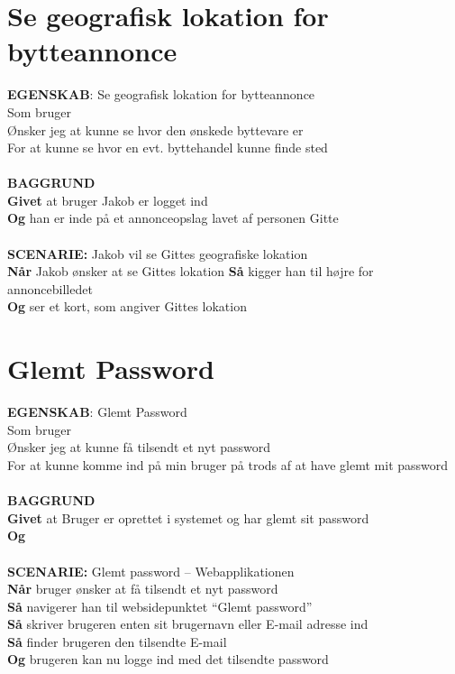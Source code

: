 \section{Se geografisk lokation for bytteannonce}
{\color{blue}\textbf{EGENSKAB}:} Se geografisk lokation for bytteannonce \\
Som bruger \\
Ønsker jeg at kunne se hvor den ønskede byttevare er \\
For at kunne se hvor en evt. byttehandel kunne finde sted\\ \\
{\color{blue}\textbf{BAGGRUND}} \\
{\color{blue}\textbf{Givet}} at bruger Jakob er logget ind \\
{\color{blue}\textbf{Og}} han er inde på et annonceopslag lavet af personen Gitte\\\\
{\color{blue}\textbf{SCENARIE:}} Jakob vil se Gittes geografiske lokation \\
{\color{blue}\textbf{Når}} Jakob ønsker at se Gittes lokation
{\color{blue}\textbf{Så}} kigger han til højre for annoncebilledet \\
{\color{blue}\textbf{Og}} ser et kort, som angiver Gittes lokation

\section{Glemt Password}
{\color{blue}\textbf{EGENSKAB}:} Glemt Password \\
Som bruger \\
Ønsker jeg at kunne få tilsendt et nyt password \\
For at kunne komme ind på min bruger på trods af at have glemt mit password\\ \\
{\color{blue}\textbf{BAGGRUND}} \\
{\color{blue}\textbf{Givet}} at Bruger er oprettet i systemet og har glemt sit password \\
{\color{blue}\textbf{Og}} \\\\
{\color{blue}\textbf{SCENARIE:}} Glemt password – Webapplikationen \\
{\color{blue}\textbf{Når}} bruger ønsker at få tilsendt et nyt password \\
{\color{blue}\textbf{Så}} navigerer han til websidepunktet  “Glemt password” \\
{\color{blue}\textbf{Så}} skriver brugeren enten sit brugernavn eller E-mail adresse ind\\
{\color{blue}\textbf{Så}} finder brugeren den tilsendte E-mail \\
{\color{blue}\textbf{Og}} brugeren kan nu logge ind med det tilsendte password

